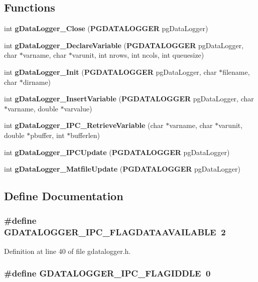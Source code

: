 \subsection*{Functions}
\begin{DoxyCompactItemize}
\item 
int {\bf gDataLogger\_\-Close} ({\bf PGDATALOGGER} pgDataLogger)
\item 
int {\bf gDataLogger\_\-DeclareVariable} ({\bf PGDATALOGGER} pgDataLogger, char $\ast$varname, char $\ast$varunit, int nrows, int ncols, int queuesize)
\item 
int {\bf gDataLogger\_\-Init} ({\bf PGDATALOGGER} pgDataLogger, char $\ast$filename, char $\ast$dirname)
\item 
int {\bf gDataLogger\_\-InsertVariable} ({\bf PGDATALOGGER} pgDataLogger, char $\ast$varname, double $\ast$varvalue)
\item 
int {\bf gDataLogger\_\-IPC\_\-RetrieveVariable} (char $\ast$varname, char $\ast$varunit, double $\ast$pbuffer, int $\ast$bufferlen)
\item 
int {\bf gDataLogger\_\-IPCUpdate} ({\bf PGDATALOGGER} pgDataLogger)
\item 
int {\bf gDataLogger\_\-MatfileUpdate} ({\bf PGDATALOGGER} pgDataLogger)
\end{DoxyCompactItemize}


\subsection{Define Documentation}
\subsubsection[{GDATALOGGER\_\-IPC\_\-FLAGDATAAVAILABLE}]{\setlength{\rightskip}{0pt plus 5cm}\#define GDATALOGGER\_\-IPC\_\-FLAGDATAAVAILABLE~2}\label{gdatalogger_8h_a3ffb6bf6a27e2f09d4a3fcac933f8dd4}


Definition at line 40 of file gdatalogger.h.
\subsubsection[{GDATALOGGER\_\-IPC\_\-FLAGIDDLE}]{\setlength{\rightskip}{0pt plus 5cm}\#define GDATALOGGER\_\-IPC\_\-FLAGIDDLE~0}\label{gdatalogger_8h_af1565d64ddabc6f1a1c3fc5fa3e7a123}


